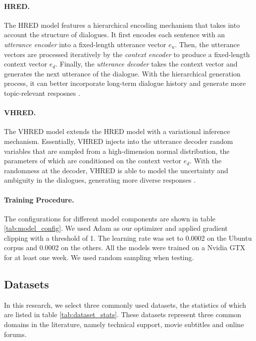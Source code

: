 \documentclass[runningheads]{llncs}
\begin{document}
    \paragraph{HRED.}
    The HRED model \cite{hred-qs,HRED} features a hierarchical encoding mechanism that takes into account the structure of dialogues. It first encodes each sentence with an \emph{utterance encoder} into a fixed-length utterance vector $e_u$. Then, the utterance vectors are processed iteratively by the \emph{context encoder} to produce a fixed-length context vector $e_d$. Finally, the \emph{utterance decoder} takes the context vector and generates the next utterance of the dialogue. With the hierarchical generation process, it can better incorporate long-term dialogue history and generate more topic-relevant resposnes \cite{A_Short_Review}.

    \paragraph{VHRED.}
    The VHRED model \cite{VHRED} extends the HRED model with a variational inference mechanism. Essentially, VHRED injects into the utterance decoder random variables that are sampled from a high-dimension normal distribution, the parameters of which are conditioned on the context vector $e_d$. With the randomness at the decoder, VHRED is able to model the uncertainty and ambiguity in the dialogues, generating more diverse responses \cite{A_Short_Review}.

    \paragraph{Training Procedure.}
    The configurations for different model components are shown in table \ref{tab:model_config}. We used Adam \cite{AdamOpt} as our optimizer and applied gradient clipping with a threshold of 1. The learning rate was set to 0.0002 on the Ubuntu corpus and 0.0002 on the others. All the models were trained on a Nvidia GTX for at least one week. We used random sampling when testing.
    

    \subsection{Datasets}
    In this research, we select three commonly used datasets, the statistics of which are listed in table \ref{tab:dataset_stats}. These datasets represent three common domains in the literature, namely technical support, movie subtitles and online forums.
    
\end{document}
